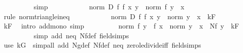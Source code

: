\begin{isabellebody}
\ \ \ \ \ \ \ \ \isamarkupfalse%
\ simp\isanewline
\ \ \ \ \ \ \isamarkupfalse%
\ \isamarkupfalse%
\ {\isachardoublequoteopen}{\isasymdots}\ {\isasymle}\ norm\ {\isacharparenleft}{\kern0pt}{\isacharquery}{\kern0pt}D\ f\ f{\isacharprime}{\kern0pt}\ x\ y{\isacharparenright}{\kern0pt}\ {\isacharplus}{\kern0pt}\ norm\ {\isacharparenleft}{\kern0pt}f{\isacharprime}{\kern0pt}\ {\isacharparenleft}{\kern0pt}y\ {\isacharminus}{\kern0pt}\ x{\isacharparenright}{\kern0pt}{\isacharparenright}{\kern0pt}{\isachardoublequoteclose}\isanewline
\ \ \ \ \ \ \ \ \isamarkupfalse%
\ {\isacharparenleft}{\kern0pt}rule\ norm{\isacharunderscore}{\kern0pt}triangle{\isacharunderscore}{\kern0pt}ineq{\isacharparenright}{\kern0pt}\isanewline
\ \ \ \ \ \ \isamarkupfalse%
\ \isamarkupfalse%
\ {\isachardoublequoteopen}{\isasymdots}\ {\isasymle}\ norm\ {\isacharparenleft}{\kern0pt}{\isacharquery}{\kern0pt}D\ f\ f{\isacharprime}{\kern0pt}\ x\ y{\isacharparenright}{\kern0pt}\ {\isacharplus}{\kern0pt}\ norm\ {\isacharparenleft}{\kern0pt}y\ {\isacharminus}{\kern0pt}\ x{\isacharparenright}{\kern0pt}\ {\isacharasterisk}{\kern0pt}\ kF{\isachardoublequoteclose}\isanewline
\ \ \ \ \ \ \ \ \isamarkupfalse%
\ kF\ \isamarkupfalse%
\ {\isacharparenleft}{\kern0pt}intro\ add{\isacharunderscore}{\kern0pt}mono{\isacharparenright}{\kern0pt}\ simp\isanewline
\ \ \ \ \ \ \isamarkupfalse%
\ \isamarkupfalse%
\ {\isachardoublequoteopen}norm\ {\isacharparenleft}{\kern0pt}f\ y\ {\isacharminus}{\kern0pt}\ f\ x{\isacharparenright}{\kern0pt}\ {\isacharslash}{\kern0pt}\ norm\ {\isacharparenleft}{\kern0pt}y\ {\isacharminus}{\kern0pt}\ x{\isacharparenright}{\kern0pt}\ {\isasymle}\ Nf\ y\ {\isacharplus}{\kern0pt}\ kF{\isachardoublequoteclose}\isanewline
\ \ \ \ \ \ \ \ \isamarkupfalse%
\ {\isacharparenleft}{\kern0pt}simp\ add{\isacharcolon}{\kern0pt}\ neq\ Nf{\isacharunderscore}{\kern0pt}def\ field{\isacharunderscore}{\kern0pt}simps{\isacharparenright}{\kern0pt}\isanewline
\ \ \ \ \isamarkupfalse%
\ {\isacharparenleft}{\kern0pt}use\ kG\ \ {\isacartoucheopen}simp{\isacharunderscore}{\kern0pt}all\ add{\isacharcolon}{\kern0pt}\ Ng{\isacharunderscore}{\kern0pt}def\ Nf{\isacharunderscore}{\kern0pt}def\ neq\ zero{\isacharunderscore}{\kern0pt}le{\isacharunderscore}{\kern0pt}divide{\isacharunderscore}{\kern0pt}iff\ field{\isacharunderscore}{\kern0pt}simps{\isacartoucheclose}{\isacharparenright}{\kern0pt}\isanewline
\ \ \ \ \isamarkupfalse%

\end{isabellebody}
